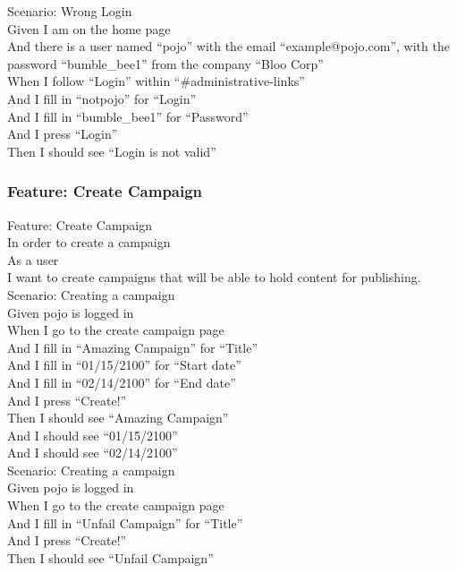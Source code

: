 \documentclass[12pt]{article}
\begin{document}
Scenario: Wrong Login \\
  Given I am on the home page \\
  And there is a user named ``pojo'' with the email ``example@pojo.com'', with the password ``bumble\_bee1'' from the company ``Bloo Corp'' \\
  When I follow ``Login'' within ``\#administrative-links'' \\
  And I fill in ``notpojo'' for ``Login'' \\
  And I fill in ``bumble\_bee1'' for ``Password'' \\
  And I press ``Login'' \\
  Then I should see ``Login is not valid'' \\

\subsubsection{Feature: Create Campaign}

Feature: Create Campaign \\
In order to create a campaign \\
As a user \\
I want to create campaigns that will be able to hold content for publishing. \\

Scenario: Creating a campaign \\
Given pojo is logged in \\
When I go to the create campaign page \\
And I fill in ``Amazing Campaign'' for ``Title'' \\
And I fill in ``01/15/2100'' for ``Start date'' \\
And I fill in ``02/14/2100'' for ``End date''   \\
And I press ``Create!'' \\
Then I should see ``Amazing Campaign'' \\
And I should see ``01/15/2100'' \\
And I should see ``02/14/2100'' \\

Scenario: Creating a campaign \\
Given pojo is logged in \\
When I go to the create campaign page \\
And I fill in ``Unfail Campaign'' for ``Title'' \\
And I press ``Create!'' \\
Then I should see ``Unfail Campaign'' \\
\end{document}
